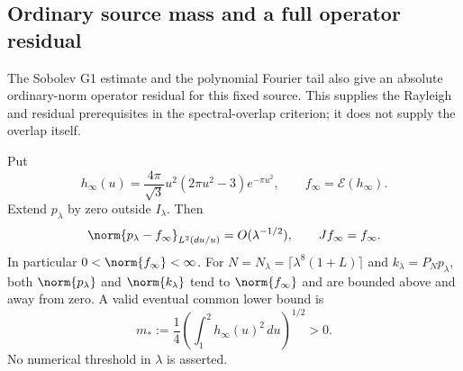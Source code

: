 \subsection*{Ordinary source mass and a full operator residual}
The Sobolev G1 estimate and the polynomial Fourier tail also give an
absolute ordinary-norm operator residual for this fixed source. This supplies the
Rayleigh and residual prerequisites in the spectral-overlap criterion;
it does not supply the overlap itself.

\begin{lemma}
\label{lem:v115-source-mass}
Put
\[
 h_\infty(u)=\frac{4\pi}{\sqrt3}u^2(2\pi u^2-3)e^{-\pi u^2},
 \qquad f_\infty=\mathcal E(h_\infty).
\]
Extend $p_\lambda$ by zero outside $I_\lambda$. Then
\begin{equation}\label{eq:v115-source-limit}
 \norm{p_\lambda-f_\infty}_{L^2(du/u)}=O(\lambda^{-1/2}),
 \qquad Jf_\infty=f_\infty.
\end{equation}
In particular $0<\norm{f_\infty}<\infty$. For
$N=N_\lambda=\lceil\lambda^8(1+L)\rceil$ and
$k_\lambda=P_Np_\lambda$, both $\norm{p_\lambda}$ and
$\norm{k_\lambda}$ tend to $\norm{f_\infty}$ and are bounded above
and away from zero. A valid eventual common lower bound is
\begin{equation}\label{eq:v115-mass-lower}
 m_*:=\frac14\left(\int_1^2h_\infty(u)^2\,du\right)^{1/2}>0.
\end{equation}
No numerical threshold in $\lambda$ is asserted.
\end{lemma}
